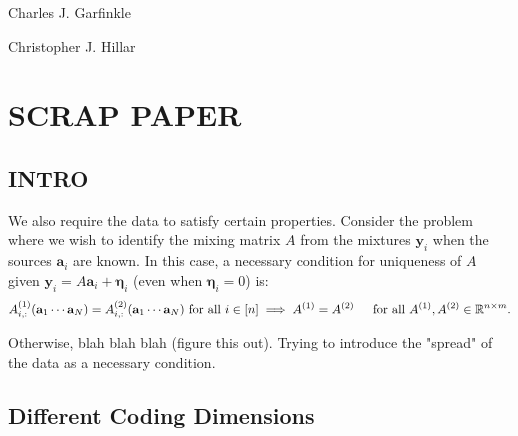 \documentclass[journal, onecolumn]{IEEEtran}
\begin{document}





\begin{IEEEbiographynophoto}{Charles J. Garfinkle}
\end{IEEEbiographynophoto}

\begin{IEEEbiographynophoto}{Christopher J. Hillar}
\end{IEEEbiographynophoto}


\section{SCRAP PAPER}

\subsection{INTRO}

We also require the data to satisfy certain properties. Consider the problem where we wish to identify the mixing matrix $A$ from the mixtures $\mathbf{y}_i$ when the sources $\mathbf{a}_i$ are known. In this case, a necessary condition for uniqueness of $A$ given $\mathbf{y}_i = A \mathbf{a}_i + \mathbf{\eta}_i$ (even when $\mathbf{\eta}_i=0$) is:
\begin{align}\label{SparkCondition2}
A^{(1)}_{i,:}(\mathbf{a}_1 \cdots \mathbf{a}_N) = A^{(2)}_{i,:}(\mathbf{a}_1 \cdots \mathbf{a}_N)  \text{ for all } i \in [n] \implies A^{(1)}  = A^{(2)} \indent \text{for all } A^{(1)}, A^{(2)} \in \mathbb{R}^{n \times m}.
\end{align}

Otherwise, blah blah blah (figure this out). Trying to introduce the "spread" of the data as a necessary condition.

\subsection{Different Coding Dimensions}
\end{document}
